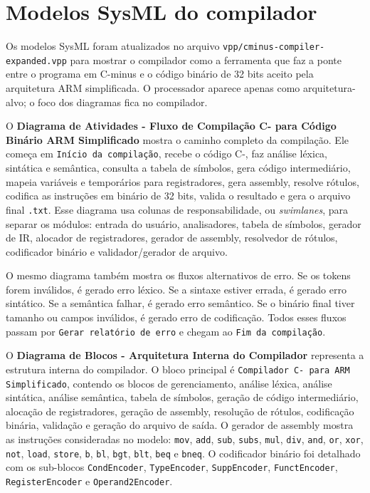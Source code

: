 \documentclass[12pt,a4paper]{article}
\begin{document}
\section{Modelos SysML do compilador}
Os modelos SysML foram atualizados no arquivo \texttt{vpp/cminus-compiler-expanded.vpp} para mostrar o compilador como a ferramenta que faz a ponte entre o programa em C-minus e o código binário de 32 bits aceito pela arquitetura ARM simplificada. O processador aparece apenas como arquitetura-alvo; o foco dos diagramas fica no compilador.

O \textbf{Diagrama de Atividades - Fluxo de Compilação C- para Código Binário ARM Simplificado} mostra o caminho completo da compilação. Ele começa em \texttt{Início da compilação}, recebe o código C-, faz análise léxica, sintática e semântica, consulta a tabela de símbolos, gera código intermediário, mapeia variáveis e temporários para registradores, gera assembly, resolve rótulos, codifica as instruções em binário de 32 bits, valida o resultado e gera o arquivo final \texttt{.txt}. Esse diagrama usa colunas de responsabilidade, ou \emph{swimlanes}, para separar os módulos: entrada do usuário, analisadores, tabela de símbolos, gerador de IR, alocador de registradores, gerador de assembly, resolvedor de rótulos, codificador binário e validador/gerador de arquivo.

O mesmo diagrama também mostra os fluxos alternativos de erro. Se os tokens forem inválidos, é gerado erro léxico. Se a sintaxe estiver errada, é gerado erro sintático. Se a semântica falhar, é gerado erro semântico. Se o binário final tiver tamanho ou campos inválidos, é gerado erro de codificação. Todos esses fluxos passam por \texttt{Gerar relatório de erro} e chegam ao \texttt{Fim da compilação}.

O \textbf{Diagrama de Blocos - Arquitetura Interna do Compilador} representa a estrutura interna do compilador. O bloco principal é \texttt{Compilador C- para ARM Simplificado}, contendo os blocos de gerenciamento, análise léxica, análise sintática, análise semântica, tabela de símbolos, geração de código intermediário, alocação de registradores, geração de assembly, resolução de rótulos, codificação binária, validação e geração do arquivo de saída. O gerador de assembly mostra as instruções consideradas no modelo: \texttt{mov}, \texttt{add}, \texttt{sub}, \texttt{subs}, \texttt{mul}, \texttt{div}, \texttt{and}, \texttt{or}, \texttt{xor}, \texttt{not}, \texttt{load}, \texttt{store}, \texttt{b}, \texttt{bl}, \texttt{bgt}, \texttt{blt}, \texttt{beq} e \texttt{bneq}. O codificador binário foi detalhado com os sub-blocos \texttt{CondEncoder}, \texttt{TypeEncoder}, \texttt{SuppEncoder}, \texttt{FunctEncoder}, \texttt{RegisterEncoder} e \texttt{Operand2Encoder}.
\end{document}
